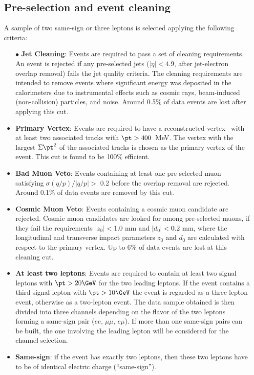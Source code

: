 \subsection{Pre-selection and event cleaning}
\label{subsec:sec.strategy.selection_cleaning}

A sample of two same-sign or three leptons is selected applying the following criteria:
\begin{itemize}
\item[$\bullet$] \textbf{Jet Cleaning}: 
Events are required to pass a set of cleaning requirements. 
An event is rejected if any pre-selected jets ($|\eta|<4.9$, after 
jet-electron overlap removal) fails the jet quality criteria. 
The cleaning requirements are intended to remove events where significant 
energy was deposited in the calorimeters 
due to instrumental effects such as cosmic rays, beam-induced (non-collision) 
particles, and noise. Around 0.5\% of data events are lost after applying 
this cut.

\item \textbf{Primary Vertex}:
Events are required to have a reconstructed vertex~\cite{ATL-PHYS-PUB-2015-026} 
with at least two associated tracks with $\pt >400$~MeV. The vertex with the largest $\Sigma \pt^2$ of the associated tracks 
is chosen as the primary vertex of the event.
This cut is found to be 100\% efficient.

\item \textbf{Bad Muon Veto}: 
Events containing at least one pre-selected muon satisfying $\sigma(q/p)/|q/p| >$ 0.2 before the overlap removal are rejected. 
Around 0.1\% of data events are removed by this cut.

\item \textbf{Cosmic Muon Veto}: 
Events containing a cosmic muon candidate are rejected. 
Cosmic muon candidates are looked for among pre-selected muons, 
if they fail the requirements $|z_0| <1.0$ mm and $|d_0|<0.2$ mm, 
where the longitudinal and transverse impact parameters $z_0$ and $d_0$ 
are calculated with respect to the primary vertex. 
Up to 6\% of data events are lost at this cleaning cut.

\item \textbf{At least two leptons}: 
Events are required to contain at least two signal leptons 
with $\pt>20 \GeV$ for the two leading leptons. 
If the event contains a third signal lepton with $\pt>10 \GeV$ the event is regarded as a three-lepton event, otherwise as a two-lepton event. 
The data sample obtained is then divided into three channels depending on the flavor of the two  leptons forming a same-sign pair ($ee$, $\mu\mu$, $e\mu$). 
If more than one same-sign pairs can be built, the one involving the leading 
lepton will be considered for the channel selection. 

\item \textbf{Same-sign}: 
if the event has exactly two leptons, then these two leptons
 have to be of identical electric charge (``same-sign'').
\end{itemize}

